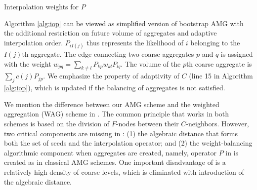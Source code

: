 \documentclass{llncs}
\begin{document}
\vspace*{-.25cm}
\incmargin{1em}
\linesnumbered
\begin{algorithm}
\caption{Interpolation weights for $P$}\label{alg:iop}
\BlankLine
{}
\end{algorithm}
\vspace*{-.5cm}
\decmargin{1em}
Algorithm \ref{alg:iop} can be viewed as simplified version of bootstrap AMG \cite{bamg-review}  with the additional restriction on future volume of aggregates and adaptive interpolation order. $P_{iI(j)}$ thus represents the likelihood of $i$ belonging to the $I(j)$th aggregate. The edge connecting two coarse aggregates $p$ and $q$ is assigned with the weight $w_{pq}=\sum_{k\not= l}P_{kp}w_{kl}P_{lq}$. The volume of the $p$th coarse aggregate is $\sum_j c(j)P_{jp}$. 
We emphasize the property of adaptivity of $C$ (line 15 in Algorithm \ref{alg:iop}), which is updated if the balancing of aggregates is not satisfied.
\par We mention the difference between our AMG scheme and the weighted aggregation (WAG) scheme in \cite{ChevalierS09}. The common principle that works in both schemes is based on the division of $F$-nodes between their $C$-neighbors.
 However, two critical components are missing in  \cite{ChevalierS09}: (1) the algebraic distance that forms both the set of seeds and the interpolation operator; and (2) the weight-balancing algorithmic component when aggregates  are created, namely, operator $P$ in \cite{ChevalierS09} is created as in classical AMG schemes. 
 One important disadvantage of \cite{ChevalierS09} is a relatively high  density of coarse levels, which is eliminated with introduction of the algebraic distance.
\end{document}
